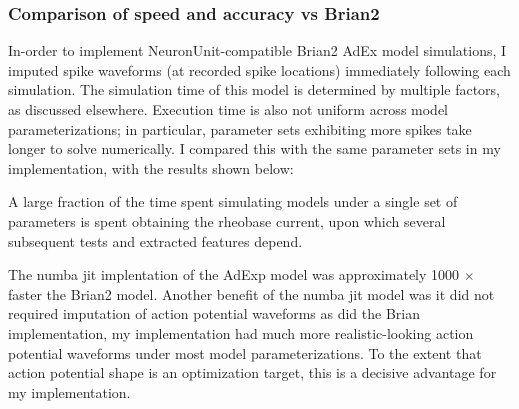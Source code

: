 \subsubsection{Comparison of speed and accuracy vs Brian2}
In-order to implement NeuronUnit-compatible Brian2 AdEx model simulations, I imputed spike waveforms (at recorded spike locations) immediately following each simulation.
The simulation time of this model is determined by multiple factors, as discussed elsewhere. Execution time is also not uniform across model parameterizations; in particular, parameter sets exhibiting more spikes take longer to solve numerically.
I compared this with the same parameter sets in my implementation, with the results shown below:

A large fraction of the time spent simulating models under a single set of parameters is spent obtaining the rheobase current, upon which several subsequent tests and extracted features depend.

The numba jit implentation of the AdExp model was approximately 1000 $\times$ faster the Brian2 model. Another benefit of the numba jit model was it did not required imputation of action potential waveforms as did the Brian implementation, my implementation had much more realistic-looking action potential waveforms under most model parameterizations.
To the extent that action potential shape is an optimization target, this is a decisive advantage for my implementation.

